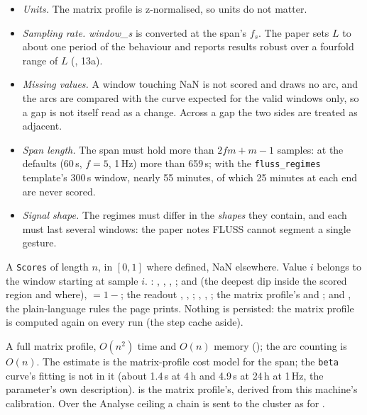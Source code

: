 \begin{itemize}
\item \emph{Units.} The matrix profile is z-normalised, so units do not matter.
\item \emph{Sampling rate.} \emph{window\_s} is converted at the span's $f_s$. The paper sets $L$ to
  about one period of the behaviour and reports results robust over a fourfold range of $L$
  (, 13a).
\item \emph{Missing values.} A window touching NaN is not scored and draws no arc, and the arcs are
  compared with the curve expected for the valid windows only, so a gap is not itself read as a
  change. Across a gap the two sides are treated as adjacent.
\item \emph{Span length.} The span must hold more than $2fm + m - 1$ samples: at the defaults
  (60\,s, $f = 5$, 1\,Hz) more than 659\,s; with the \texttt{fluss\_regimes} template's 300\,s
  window, nearly 55 minutes, of which 25 minutes at each end are never scored.
\item \emph{Signal shape.} The regimes must differ in the \emph{shapes} they contain, and each must
  last several windows: the paper notes FLUSS cannot segment a single gesture.
\end{itemize}

A \texttt{Scores} of length $n$, in $[0, 1]$ where defined, NaN elsewhere. Value $i$ belongs to the
window starting at sample $i$. : , , ,
;  and  (the deepest dip inside the scored region
and where),  $= 1 - $; the readout ,
, ; , ,
; the matrix profile's  and ; and ,
the plain-language rules the page prints. Nothing is persisted: the matrix profile is computed again
on every run (the step cache aside).

A full matrix profile, $O(n^2)$ time and $O(n)$ memory ();
the arc counting is $O(n)$. The estimate is the matrix-profile cost model for the span; the
\texttt{beta} curve's fitting is not in it (about 1.4\,s at 4\,h and 4.9\,s at 24\,h at 1\,Hz,
the parameter's own description).  is the matrix profile's, derived from
this machine's calibration. Over the Analyse ceiling a chain is sent to the cluster as for
.

